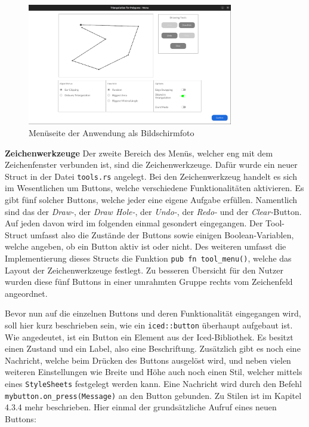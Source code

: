 \begin{figure}[h]
    \centering
    \includegraphics[width=0.8\textwidth]{bilder/menu.png}
    \caption[Menüseite der Anwendung]{Menüseite der Anwendung als Bildschirmfoto}
    
\end{figure}

\textbf{Zeichenwerkzeuge}\linebreak
Der zweite Bereich des Menüs, welcher eng mit dem Zeichenfenster verbunden ist, sind die Zeichenwerkzeuge. Dafür wurde ein neuer Struct in der Datei \lstinline{tools.rs} angelegt.  Bei den Zeichenwerkzeug handelt es sich im Wesentlichen um Buttons, welche verschiedene Funktionalitäten aktivieren.
Es gibt fünf solcher Buttons, welche jeder eine eigene Aufgabe erfüllen. Namentlich sind das der \emph{Draw-}, der \emph{Draw Hole-}, der \emph{Undo-}, der \emph{Redo-} und der \emph{Clear-}Button. Auf jeden davon wird im folgenden einmal gesondert eingegangen.
Der Tool-Struct umfasst also die Zustände der Buttons sowie einigen Boolean-Variablen, welche angeben, ob ein Button aktiv ist oder nicht. Des weiteren umfasst die Implementierung dieses Structs die Funktion \lstinline{pub fn tool_menu()}, welche das Layout der Zeichenwerkzeuge festlegt.
Zu besseren Übersicht für den Nutzer wurden diese fünf Buttons in einer umrahmten Gruppe rechts vom Zeichenfeld angeordnet.

Bevor nun auf die einzelnen Buttons und deren Funktionalität eingegangen wird, soll hier kurz beschrieben sein, wie ein \lstinline{iced::button} überhaupt aufgebaut ist. 
Wie angedeutet, ist ein Button ein Element aus der Iced-Bibliothek. Es besitzt einen Zustand und ein Label, also eine Beschriftung. Zusätzlich gibt es noch eine Nachricht, welche beim Drücken des Buttons ausgelöst wird, und neben vielen weiteren Einstellungen wie Breite und Höhe auch noch einen 
Stil, welcher mittels eines \lstinline{StyleSheets} festgelegt werden kann. Eine Nachricht wird durch den Befehl \lstinline{mybutton.on_press(Message)} an den Button gebunden. 
Zu Stilen ist im Kapitel 4.3.4 mehr beschrieben. Hier einmal der grundsätzliche Aufruf eines neuen Buttons:


